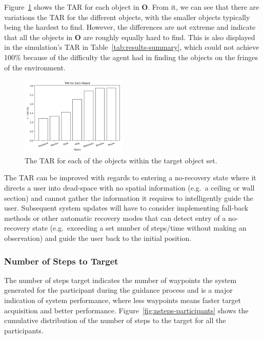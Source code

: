 \documentclass[a4paper, twoside]{article}
\begin{document}
Figure~\ref{fig:tar-objects} shows the TAR for each object in $\mathbf{O}$. From it, we can see that there are variations the TAR for the different objects, with the smaller objects typically being the hardest to find. However, the differences are not extreme and indicate that all the objects in $\mathbf{O}$ are roughly equally hard to find. This is also displayed in the simulation's TAR in Table~\ref{tab:results-summary}, which could not achieve 100\% because of the difficulty the agent had in finding the objects on the fringes of the environment. 


\begin{figure}
  \centering
  \includegraphics[width=0.45\textwidth]{figures/tar_objects.png}
  \caption{The TAR for each of the objects within the target object set. }\label{fig:tar-objects}
\end{figure}

The TAR can be improved with regards to entering a no-recovery state where it directs a user into dead-space with no spatial information (e.g.\ a ceiling or wall section) and cannot gather the information it requires to intelligently guide the user. Subsequent system updates will have to consider implementing fall-back methods or other automatic recovery modes that can detect entry of a no-recovery state (e.g.\ exceeding a set number of steps/time without making an observation) and guide the user back to the initial position.

\subsubsection{Number of Steps to Target}

\noindent The number of steps target indicates the number of waypoints the system generated for the participant during the guidance process and is a major indication of system performance, where less waypoints means faster target acquisition and better performance. Figure~\ref{fig:nsteps-participants} shows the cumulative distribution of the number of steps to the target for all the participants. 
\end{document}
